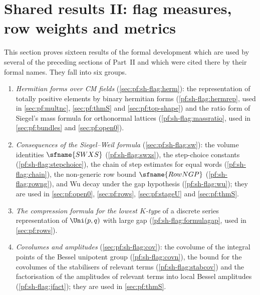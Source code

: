 \section{Shared results II: flag measures, row weights and metrics}\label{sec:pf:sh-flag}

\providecommand{\shflagmass}{\operatorname{mass}}
\providecommand{\shflagHS}[1]{\|#1\|_{\mathrm{HS}}}
\providecommand{\shflagcovN}{\operatorname{cov}_N}
\providecommand{\shflagvolR}{\operatorname{vol}_R}
\providecommand{\shflagII}{\mathrm{II}}
\providecommand{\shflagrel}{\mathcal T^{\mathrm{rel}}}

This section proves sixteen results of the formal development \cite{LeanSource2026} which are used by
several of the preceding sections of Part~II and which were cited there by their formal names. They fall
into six groups.
\begin{enumerate}[label=(\arabic*)]
\item \emph{Hermitian forms over CM fields} (\cref{sec:pf:sh-flag:herm}): the representation of totally
positive elements by binary hermitian forms (\cref{pf:sh-flag:hermrep}, used in \cref{sec:pf:multnc},
\cref{sec:pf:thmS} and \cref{sec:pf:top-shape}) and the ratio form of Siegel's mass formula for
orthonormal lattices (\cref{pf:sh-flag:massratio}, used in \cref{sec:pf:bundles} and
\cref{sec:pf:open0}).
\item \emph{Consequences of the Siegel--Weil formula} (\cref{sec:pf:sh-flag:sw}): the volume identities
$\sfname{SWXS}$ (\cref{pf:sh-flag:swxs}), the step-choice constants (\cref{pf:sh-flag:stepchoice}), the
chain of step estimates for equal words (\cref{pf:sh-flag:chain}), the non-generic row bound
$\sfname{RowNGP}$ (\cref{pf:sh-flag:rowng}), and Wu decay under the gap hypothesis
(\cref{pf:sh-flag:wu}); they are used in \cref{sec:pf:open0}, \cref{sec:pf:rows}, \cref{sec:pf:stageU}
and \cref{sec:pf:thmS}.
\item \emph{The compression formula for the lowest $K$-type} of a discrete series representation of
$\Uni(p,q)$ with large gap (\cref{pf:sh-flag:formulagap}, used in \cref{sec:pf:rows}).
\item \emph{Covolumes and amplitudes} (\cref{sec:pf:sh-flag:cov}): the covolume of the integral points of
the Bessel unipotent group (\cref{pf:sh-flag:covn}), the bound for the covolumes of the stabilisers of
relevant terms (\cref{pf:sh-flag:stabcov}) and the factorisation of the amplitudes of relevant terms into
local Bessel amplitudes (\cref{pf:sh-flag:jfact}); they are used in \cref{sec:pf:thmS}.

\end{enumerate}
